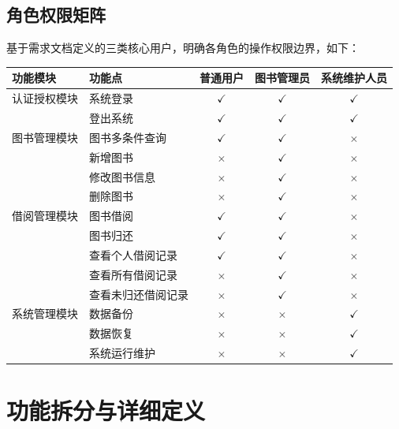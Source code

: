 \documentclass[12pt, a4paper]{article}
\begin{document}
\newpage
\subsection{角色权限矩阵}

基于需求文档定义的三类核心用户，明确各角色的操作权限边界，如下：

\begin{table}[H]
    \centering
    \begin{tabularx}{\linewidth}{|X|X|c|c|c|}
        \hline
        功能模块 & 功能点 & 普通用户 & 图书管理员 & 系统维护人员 \\
        \hline
        认证授权模块 & 系统登录 & $\checkmark$ & $\checkmark$ & $\checkmark$ \\
        \hline
        & 登出系统 & $\checkmark$ & $\checkmark$ & $\checkmark$ \\
        \hline
        图书管理模块 & 图书多条件查询 & $\checkmark$ & $\checkmark$ & $\times$ \\
        \hline
        & 新增图书 & $\times$ & $\checkmark$ & $\times$ \\
        \hline
        & 修改图书信息 & $\times$ & $\checkmark$ & $\times$ \\
        \hline
        & 删除图书 & $\times$ & $\checkmark$ & $\times$ \\
        \hline
        借阅管理模块 & 图书借阅 & $\checkmark$ & $\checkmark$ & $\times$ \\
        \hline
        & 图书归还 & $\checkmark$ & $\checkmark$ & $\times$ \\
        \hline
        & 查看个人借阅记录 & $\checkmark$ & $\checkmark$ & $\times$ \\
        \hline
        & 查看所有借阅记录 & $\times$ & $\checkmark$ & $\times$ \\
        \hline
        & 查看未归还借阅记录 & $\times$ & $\checkmark$ & $\times$ \\
        \hline
        系统管理模块 & 数据备份 & $\times$ & $\times$ & $\checkmark$ \\
        \hline
        & 数据恢复 & $\times$ & $\times$ & $\checkmark$ \\
        \hline
        & 系统运行维护 & $\times$ & $\times$ & $\checkmark$ \\
        \hline
    \end{tabularx}
\end{table}

\newpage
\section{功能拆分与详细定义}
\end{document}
